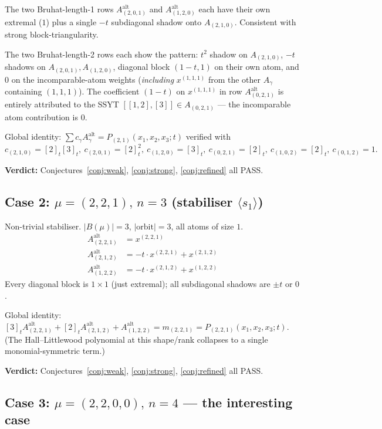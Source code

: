 \documentclass[11pt]{article}
\theoremstyle{definition}
\theoremstyle{remark}
\newcommand{\Aalt}{A^{\mathrm{alt}}}
\begin{document}
The two Bruhat-length-1 rows $\Aalt_{(2,0,1)}$ and $\Aalt_{(1,2,0)}$
each have their own extremal ($1$) plus a single $-t$ subdiagonal shadow
onto $A_{(2,1,0)}$. Consistent with strong block-triangularity.

The two Bruhat-length-2 rows each show the pattern:
$t^2$ shadow on $A_{(2,1,0)}$, $-t$ shadows on $A_{(2,0,1)}, A_{(1,2,0)}$,
diagonal block $(1-t, 1)$ on their own atom, and $0$ on the
incomparable-atom weights (\emph{including} $x^{(1,1,1)}$ from the other
$A_\gamma$ containing $(1,1,1)$). The coefficient $(1-t)$ on $x^{(1,1,1)}$
in row $\Aalt_{(0,2,1)}$ is entirely attributed to the SSYT $[[1,2],[3]] \in A_{(0,2,1)}$
--- the incomparable atom contribution is $0$.

Global identity:
$\sum c_\gamma \Aalt_\gamma = P_{(2,1)}(x_1, x_2, x_3; t)$ verified with
\[
   c_{(2,1,0)} = [2]_t [3]_t,\ c_{(2,0,1)} = [2]_t^2,\ c_{(1,2,0)} = [3]_t,\ c_{(0,2,1)} = [2]_t,\ c_{(1,0,2)} = [2]_t,\ c_{(0,1,2)} = 1.
\]

\noindent\textbf{Verdict:} Conjectures~\ref{conj:weak}, \ref{conj:strong}, \ref{conj:refined} all PASS.

\subsection{Case 2: $\mu = (2,2,1),\, n = 3$ (stabiliser $\langle s_1 \rangle$)}

Non-trivial stabiliser. $|B(\mu)| = 3$, $|\text{orbit}| = 3$, all atoms of size $1$.
\begin{align*}
\Aalt_{(2,2,1)} &= x^{(2,2,1)} \\
\Aalt_{(2,1,2)} &= -t \cdot x^{(2,2,1)} + x^{(2,1,2)} \\
\Aalt_{(1,2,2)} &= -t \cdot x^{(2,1,2)} + x^{(1,2,2)}
\end{align*}
Every diagonal block is $1 \times 1$ (just extremal); all subdiagonal
shadows are $\pm t$ or $0$.

Global identity: $[3]_t \Aalt_{(2,2,1)} + [2]_t \Aalt_{(2,1,2)} + \Aalt_{(1,2,2)} = m_{(2,2,1)} = P_{(2,2,1)}(x_1,x_2,x_3;t)$.
(The Hall--Littlewood polynomial at this shape/rank collapses to a single monomial-symmetric term.)

\noindent\textbf{Verdict:} Conjectures~\ref{conj:weak}, \ref{conj:strong}, \ref{conj:refined} all PASS.

\subsection{Case 3: $\mu = (2,2,0,0),\, n = 4$ --- the interesting case}
\label{sec:n4}
\end{document}
